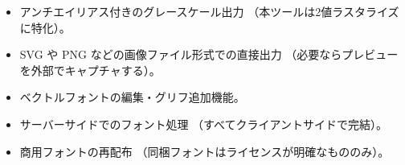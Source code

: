\begin{itemize}[leftmargin=*,itemsep=2pt]
  \item アンチエイリアス付きのグレースケール出力
        （本ツールは2値ラスタライズに特化）。
  \item SVG や PNG などの画像ファイル形式での直接出力
        （必要ならプレビューを外部でキャプチャする）。
  \item ベクトルフォントの編集・グリフ追加機能。
  \item サーバーサイドでのフォント処理
        （すべてクライアントサイドで完結）。
  \item 商用フォントの再配布
        （同梱フォントはライセンスが明確なもののみ）。
\end{itemize}

\newpage
